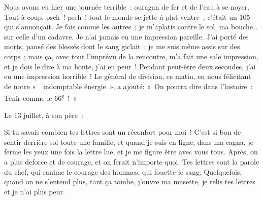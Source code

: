 \documentclass[french,twoside]{book} %
\newenvironment{quoteblock}%
  {\begin{quoting}}
  {\end{quoting}}
\newenvironment{quotebar}{%
    \def\FrameCommand{{\color{rubric!10!}\vrule width 0.5em} \hspace{0.9em}}%
    \def\OuterFrameSep{\itemsep} %
    \MakeFramed {\advance\hsize-\width \FrameRestore}
  }%
  {%
    \endMakeFramed
  }
\renewenvironment{quoteblock}%
  {%
    \savenotes
    \setstretch{0.9}
    \normalfont
    \begin{quotebar}
  }
  {%
    \end{quotebar}
    \spewnotes
  }
\begin{document}
\begin{quoteblock}
 \noindent Nous avons eu hier une journée terrible : ouragan de fer et de l’eau à se noyer. Tout à coup, psch ! psch ! tout le monde se jette à plat ventre ; c’était un 105 qui s’annonçait. Je fais comme les autres ; je m’aplatis contre le sol, ma bouche… sur celle d’un cadavre. Je n’ai jamais eu une impression pareille. J’ai porté des morts, pansé des blessés dont le sang giclait ; je me suis même assis sur des corps ; mais ça, avec tout l’imprévu de la rencontre, m’a fait une sale impression, et je dois le dire à ma honte, j’ai eu peur ! Pendant peut-être deux secondes, j’ai eu une impression horrible ! Le général de division, ce matin, en nous félicitant de notre «  indomptable énergie », a ajouté: « On pourra dire dans l’histoire : Tenir comme le 66\textsuperscript{e} ! »‌
 \end{quoteblock}

\noindent Le 13 juillet, à son père :‌\par

\begin{quoteblock}
 \noindent Si tu savais combien tes lettres sont un réconfort pour moi ! C’est si bon de sentir derrière soi toute une famille, et quand je suis en ligne, dans ma cagna, je ferme les yeux une fois la lettre lue, et je me figure être avec vous tous. Après, on a plus deforce et de courage, et on ferait n’importe quoi. Tes lettres sont la parole du chef, qui ranime le courage des hommes, qui fouette le sang. Quelquefois, quand on ne s’entend plus, tant ça tombe, j’ouvre ma musette, je relis tes lettres et je n’ai plus peur.‌
 \end{quoteblock}
\end{document}
